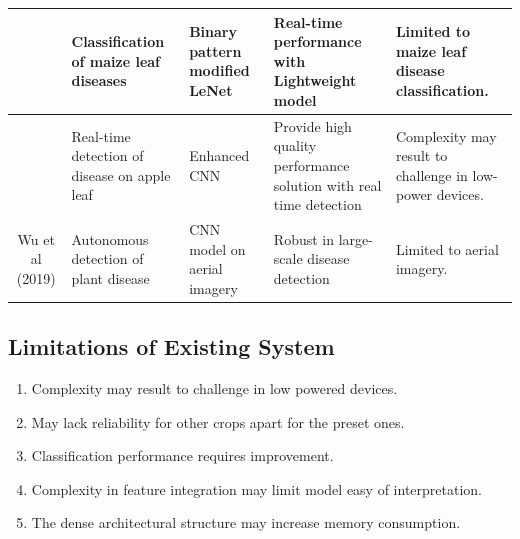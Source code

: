\begin{center}
\begin{longtable}{|c|p{2cm}|p{2cm}|p{2cm}|p{2cm}|}
		\hline
		\cite{ahilaMaizeLeafDisease2019}
		 &	Classification of maize leaf diseases &	Binary pattern modified LeNet &	Real-time performance with Lightweight model &	Limited to maize leaf disease classification.\\
		
		\hline
		\cite{jiangRealTimeDetectionApple2019a} & Real-time detection of disease on apple leaf & Enhanced CNN & Provide high quality performance solution with real time detection & Complexity may result to challenge in low-power devices.\\
		
		\hline
		Wu et al (2019) 	&Autonomous detection of plant disease&	CNN model on aerial imagery	& Robust in large-scale disease detection&	Limited to aerial imagery.\\
		\hline
		
	\end{longtable}
\end{center}

\subsection{Limitations of Existing System}\sectionTitleBody
\begin{enumerate}
	\item Complexity may result to challenge in low powered devices.
	\item May lack reliability for other crops apart for the preset
	ones.
	\item Classification performance requires improvement.
	\item Complexity in feature integration may limit model easy of
	interpretation.
	\item The dense architectural structure may increase memory consumption.
\end{enumerate}

